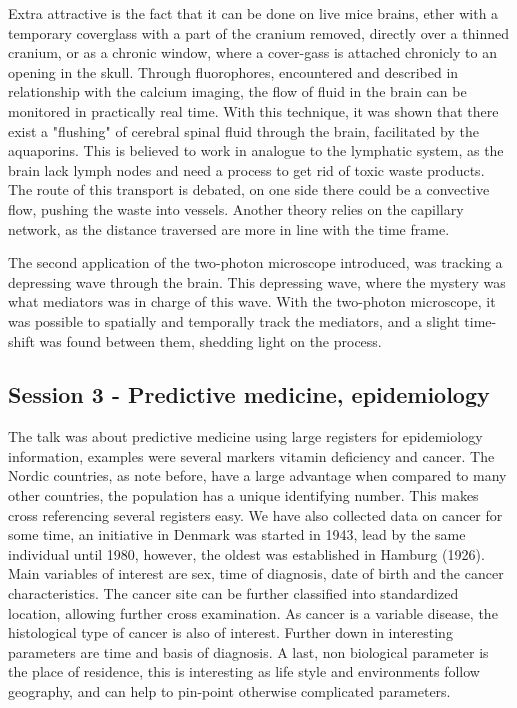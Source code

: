 \documentclass[12p]{article}
\begin{document}
Extra attractive is the fact that it can be done on live mice brains, ether with a temporary coverglass with a part of the cranium removed, directly over a thinned cranium, or as a chronic window, where a cover-gass is attached chronicly to an opening in the skull.
Through fluorophores, encountered and described in relationship with the calcium imaging, the flow of fluid in the brain can be monitored in practically real time.
With this technique, it was shown that there exist a "flushing" of cerebral spinal fluid through the brain, facilitated by the aquaporins.
This is believed to work in analogue to the lymphatic system, as the brain lack lymph nodes and need a process to get rid of toxic waste products.
The route of this transport is debated, on one side there could be a convective flow, pushing the waste into vessels.
Another theory relies on the capillary network, as the distance traversed are more in line with the time frame.

The second application of the two-photon microscope introduced, was tracking a depressing wave through the brain.
This depressing wave, where the mystery was what mediators was in charge of this wave.
With the two-photon microscope, it was possible to spatially and temporally track the mediators, and a slight time-shift was found between them, shedding light on the process.

\subsection*{Session 3 - Predictive medicine, epidemiology}

The talk was about predictive medicine using large registers for epidemiology information, examples were several markers vitamin deficiency and cancer.
The Nordic countries, as note before, have a large advantage when compared to many other countries, the population has a unique identifying number.
This makes cross referencing several registers easy.
We have also collected data on cancer for some time, an initiative in Denmark was started in 1943, lead by the same individual until 1980, however, the oldest was established in Hamburg (1926).
Main variables of interest are sex, time of diagnosis, date of birth and the cancer characteristics.
The cancer site can be further classified into standardized location, allowing further cross examination.
As cancer is a variable disease, the histological type of cancer is also of interest.
Further down in interesting parameters are time and basis of diagnosis.
A last, non biological parameter is the place of residence, this is interesting as life style and environments follow geography, and can help to pin-point otherwise complicated parameters.
\end{document}
